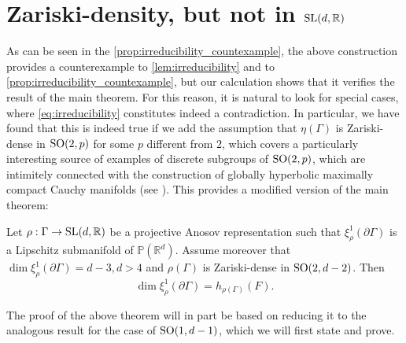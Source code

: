 \documentclass{report}
\begin{document}
\section{Zariski-density, but not in $\operatorname{{\mathrm{SL}}}(d,\mathbb R)$}
As can be seen in the \cref{prop:irreducibility_countexample}, the above construction provides a counterexample to \cref{lem:irreducibility} and to \cref{prop:irreducibility_countexample}, but our calculation shows that it verifies the result of the main theorem.
For this reason, it is natural to look for special cases, where \cref{eq:irreducibility} constitutes indeed a contradiction.
In particular, we have found that this is indeed true if we add the assumption that $\eta(\Gamma)$ is Zariski-dense in $\operatorname{{\mathrm{SO}}}(2,p)$ for some $p$ different from $2$, which covers a particularly interesting source of examples of discrete subgroups of $\operatorname{{\mathrm{SO}}}(2,p)$, which are intimitely connected with the construction of globally hyperbolic maximally compact Cauchy manifolds (see \cite{monclair2023gromov}).
This provides a modified version of the main theorem:
\begin{theorem}\label{thm:main_anti_de_sitter}
    Let $\rho: \Gamma \to \operatorname{{\mathrm{SL}}}(d, \mathbb R)$ be a projective Anosov representation such that $\xi^1_\rho(\partial \Gamma)$ is a Lipschitz submanifold of $\mathbb P(\mathbb R^d)$.
    Assume moreover that $\dim \xi_\rho^1(\partial \Gamma) = d-3, d > 4$ and $\rho(\Gamma)$ is Zariski-dense in $\operatorname{{\mathrm{SO}}}(2,d-2)$. 
    Then
    \[
        \dim \xi_\rho^1(\partial \Gamma) = h_{\rho(\Gamma)}(F).
    \]
\end{theorem}
The proof of the above theorem will in part be based on reducing it to the analogous result for the case of $\operatorname{{\mathrm{SO}}}(1, d-1)$, which we will first state and prove.
\end{document}
